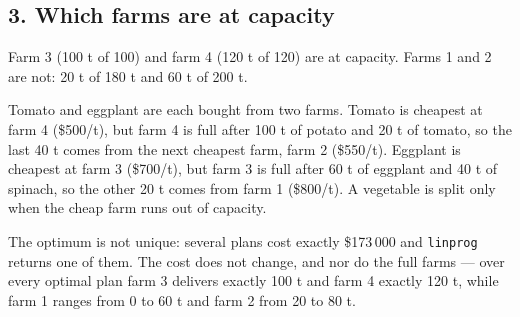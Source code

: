\documentclass[11pt,a4paper]{article}
\begin{document}
\subsection*{3. Which farms are at capacity}

Farm 3 (100 t of 100) and farm 4 (120 t of 120) are at capacity. Farms 1 and 2
are not: 20 t of 180 t and 60 t of 200 t.

Tomato and eggplant are each bought from two farms. Tomato is cheapest at farm 4
(\$500/t), but farm 4 is full after 100 t of potato and 20 t of tomato, so the
last 40 t comes from the next cheapest farm, farm 2 (\$550/t). Eggplant is
cheapest at farm 3 (\$700/t), but farm 3 is full after 60 t of eggplant and
40 t of spinach, so the other 20 t comes from farm 1 (\$800/t). A vegetable is
split only when the cheap farm runs out of capacity.

The optimum is not unique: several plans cost exactly \$173\,000 and
\texttt{linprog} returns one of them. The cost does not change, and nor do the
full farms --- over every optimal plan farm 3 delivers exactly 100 t and farm 4
exactly 120 t, while farm 1 ranges from 0 to 60 t and farm 2 from 20 to 80 t.
\end{document}

